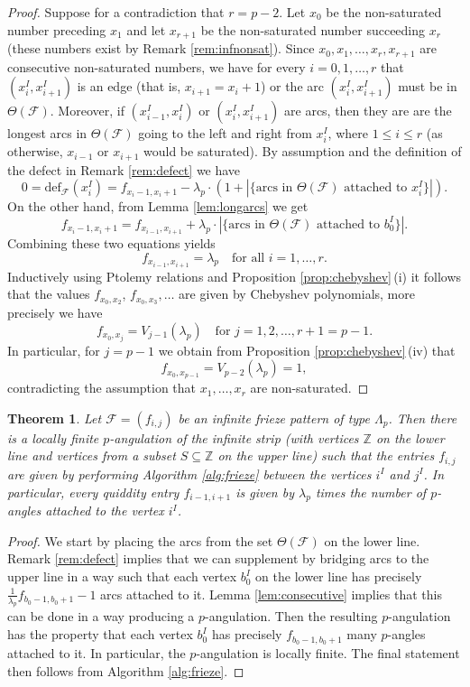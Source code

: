 \documentclass[11pt,a4paper]{amsart}
\newtheorem{Theorem}[Lemma]{Theorem}
\theoremstyle{definition}
\numberwithin{equation}{section}
\begin{document}
\begin{proof}
Suppose for a contradiction that $r= p-2$. Let $x_0$ be the non-saturated number preceding $x_1$ and
let $x_{r+1}$ be the non-saturated number succeeding $x_r$ (these numbers exist by Remark 
\ref{rem:infnonsat}). Since $x_0,x_1,\ldots,x_r,x_{r+1}$ are consecutive non-saturated numbers, we have
for every $i=0,1,\ldots,r$ 
that $(x_i^I,x_{i+1}^I)$ is an edge (that is, $x_{i+1}=x_i+1$) or 
the
arc $(x_i^I,x_{i+1}^I)$ must be in $\Theta(\mathcal{F})$. Moreover, if 
$(x_{i-1}^I,x_{i}^I)$ or $(x_i^I,x_{i+1}^I)$ are arcs, then they are are the longest arcs in $\Theta(\mathcal{F})$ going 
to the left and right from $x_i^I$, where $1\le i\le r$ (as otherwise, $x_{i-1}$ or $x_{i+1}$ would be 
saturated). By assumption and the definition of the defect in Remark \ref{rem:defect} 
we have
$$0 = \mathrm{def}_{\mathcal{F}}(x_i^I)=
f_{x_i-1,x_i+1} - \lambda_p\cdot ( 1+ |\{ \text{arcs in $\Theta(\mathcal{F})$ attached to $x_i^I$}\}|).
$$
On the other hand, from Lemma \ref{lem:longarcs} we get 
$$f_{x_i-1,x_i+1} = f_{x_{i-1},x_{i+1}} + \lambda_p\cdot |\{\text{arcs in $\Theta(\mathcal{F})$ attached to $b_0^I$}\}|.
$$
Combining these two equations yields
$$f_{x_{i-1},x_{i+1}} = \lambda_p\text{~~~for all $i=1,\ldots,r$}.
$$
Inductively using Ptolemy relations and Proposition \ref{prop:chebyshev}\,(i) it follows that 
the values $f_{x_0,x_2}$, $f_{x_0,x_3},\ldots$ are given by Chebyshev polynomials, more precisely we have
$$f_{x_0,x_j} = V_{j-1}(\lambda_p)\text{~~~for $j=1,2,\ldots, r+1=p-1$.}
$$
In particular, for $j=p-1$ we obtain from Proposition \ref{prop:chebyshev}\,(iv) that
$$ f_{x_0,x_{p-1}} = V_{p-2}(\lambda_p)=1,
$$
contradicting the assumption that $x_1,\ldots,x_r$ are non-saturated. 
\end{proof}



\begin{Theorem} \label{thm:pangulation}
Let $\mathcal{F}=(f_{i,j})$ be an infinite frieze pattern of type $\Lambda_p$. Then there is a locally finite
$p$-angulation of the infinite strip (with vertices $\mathbb{Z}$ on the lower line and 
vertices from a subset $S\subseteq \mathbb{Z}$ on the upper line) such that the entries $f_{i,j}$ are given
by performing Algorithm \ref{alg:frieze} between the vertices $i^I$ and $j^I$. In particular,
every quiddity entry $f_{i-1,i+1}$ is given by $\lambda_p$ times the number of $p$-angles attached to the vertex $i^I$. 
\end{Theorem}


\begin{proof}
We start by placing the arcs from the set $\Theta(\mathcal{F})$ on the lower line. Remark \ref{rem:defect}
implies that we can supplement by bridging arcs to the upper line in a way such that each vertex $b_0^I$ on the lower 
line has precisely $\frac{1}{\lambda_p}f_{b_0-1,b_0+1} -1$ arcs attached to it. Lemma \ref{lem:consecutive}
implies that this can be done in a way producing a $p$-angulation. Then the resulting $p$-angulation has the 
property that each vertex $b_0^I$ has precisely $f_{b_0-1,b_0+1}$ many $p$-angles attached to it. In particular,
the $p$-angulation is locally finite. 
The final statement then follows from Algorithm \ref{alg:frieze}.
\end{proof}
\end{document}
